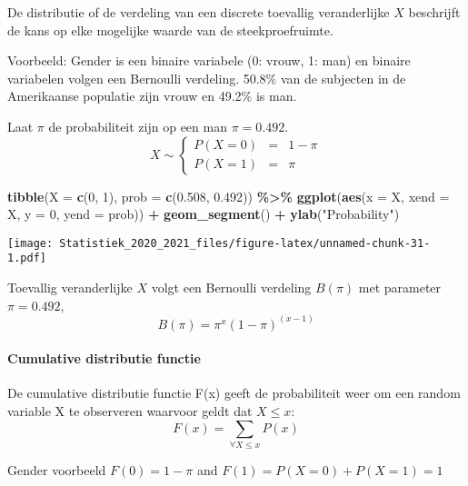 \documentclass[
  12pt,dutch,coursenotes]{book}
\newenvironment{Shaded}{\begin{snugshade}}{\end{snugshade}}
\newcommand{\DataTypeTok}[1]{\textcolor[rgb]{0.13,0.29,0.53}{#1}}
\newcommand{\DecValTok}[1]{\textcolor[rgb]{0.00,0.00,0.81}{#1}}
\newcommand{\FloatTok}[1]{\textcolor[rgb]{0.00,0.00,0.81}{#1}}
\newcommand{\KeywordTok}[1]{\textcolor[rgb]{0.13,0.29,0.53}{\textbf{#1}}}
\newcommand{\NormalTok}[1]{#1}
\newcommand{\OperatorTok}[1]{\textcolor[rgb]{0.81,0.36,0.00}{\textbf{#1}}}
\newcommand{\StringTok}[1]{\textcolor[rgb]{0.31,0.60,0.02}{#1}}
\theoremstyle{definition}
\theoremstyle{definition}
\theoremstyle{definition}
\theoremstyle{remark}
\begin{document}
De distributie of de verdeling van een discrete toevallig veranderlijke \(X\) beschrijft de kans op elke mogelijke waarde van de steekproefruimte.

Voorbeeld: Gender is een binaire variabele (0: vrouw, 1: man) en binaire variabelen volgen een Bernoulli verdeling. 50.8\% van de subjecten in de Amerikaanse populatie zijn vrouw en 49.2\% is man.

Laat \(\pi\) de probabiliteit zijn op een man \(\pi=0.492\).
\[ X\sim \left \{
    \begin{array}{lcl}
    P(X=0) &=& 1-\pi\\
    P(X=1) &=& \pi
    \end{array} \right . \]

\begin{Shaded}
\begin{Highlighting}[]
\KeywordTok{tibble}\NormalTok{(}\DataTypeTok{X =} \KeywordTok{c}\NormalTok{(}\DecValTok{0}\NormalTok{, }\DecValTok{1}\NormalTok{), }\DataTypeTok{prob =} \KeywordTok{c}\NormalTok{(}\FloatTok{0.508}\NormalTok{, }\FloatTok{0.492}\NormalTok{)) }\OperatorTok{\%\textgreater{}\%}\StringTok{ }\KeywordTok{ggplot}\NormalTok{(}\KeywordTok{aes}\NormalTok{(}\DataTypeTok{x =}\NormalTok{ X, }
    \DataTypeTok{xend =}\NormalTok{ X, }\DataTypeTok{y =} \DecValTok{0}\NormalTok{, }\DataTypeTok{yend =}\NormalTok{ prob)) }\OperatorTok{+}\StringTok{ }\KeywordTok{geom\_segment}\NormalTok{() }\OperatorTok{+}\StringTok{ }
\StringTok{    }\KeywordTok{ylab}\NormalTok{(}\StringTok{"Probability"}\NormalTok{)}
\end{Highlighting}
\end{Shaded}

\texttt{[image: Statistiek\_2020\_2021\_files/figure-latex/unnamed-chunk-31-1.pdf]}

Toevallig veranderlijke \(X\) volgt een Bernoulli verdeling \(B(\pi)\) met parameter \(\pi=0.492\),
\[B(\pi)= \pi^x(1-\pi)^{(x-1)}\]

\hypertarget{cumulative-distributie-functie}{%
\paragraph{Cumulative distributie functie}\label{cumulative-distributie-functie}}

De cumulative distributie functie F(x) geeft de probabiliteit weer om een random variable X te observeren waarvoor geldt dat \(X\leq x\):
\[ F(x) = \sum\limits_{\forall X\leq x} P(x)\]

Gender voorbeeld \(F(0)=1-\pi\) and \(F(1)= P(X=0) + P(X=1)=1\)
\end{document}
